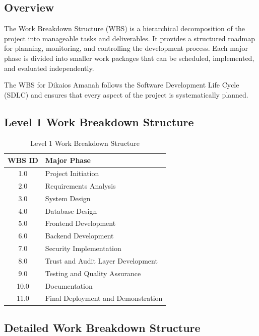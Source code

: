 \subsection{Overview}

The Work Breakdown Structure (WBS) is a hierarchical decomposition of the project into manageable tasks and deliverables. It provides a structured roadmap for planning, monitoring, and controlling the development process. Each major phase is divided into smaller work packages that can be scheduled, implemented, and evaluated independently.

The WBS for Dikaios Amanah follows the Software Development Life Cycle (SDLC) and ensures that every aspect of the project is systematically planned.


\subsection{Level 1 Work Breakdown Structure}

\begin{table}[H]
\centering
\begin{tabular}{|c|p{10cm}|}
\hline
\textbf{WBS ID} & \textbf{Major Phase} \\
\hline
1.0 & Project Initiation \\
\hline
2.0 & Requirements Analysis \\
\hline
3.0 & System Design \\
\hline
4.0 & Database Design \\
\hline
5.0 & Frontend Development \\
\hline
6.0 & Backend Development \\
\hline
7.0 & Security Implementation \\
\hline
8.0 & Trust and Audit Layer Development \\
\hline
9.0 & Testing and Quality Assurance \\
\hline
10.0 & Documentation \\
\hline
11.0 & Final Deployment and Demonstration \\
\hline
\end{tabular}
\caption{Level 1 Work Breakdown Structure}
\end{table}


\subsection{Detailed Work Breakdown Structure}

